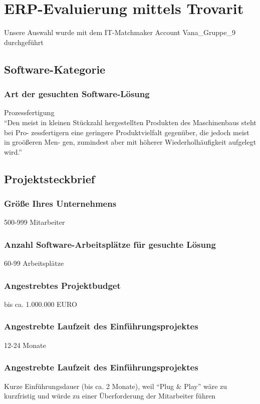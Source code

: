 \section{ERP-Evaluierung mittels Trovarit}
Unsere Auswahl wurde mit dem IT-Matchmaker Account Vana\_Gruppe\_9 durchgeführt


\subsection{Software-Kategorie}
\subsubsection{Art der gesuchten Software-Lösung}
Prozessfertigung\\
\enquote{Den meist in kleinen Stückzahl hergestellten Produkten des Maschinenbaus steht bei Pro- zessfertigern eine geringere Produktvielfalt gegenüber, die jedoch meist in groößeren Men- gen, zumindest aber mit höherer Wiederholhäufigkeit aufgelegt wird.} \cite{trovarit_prozessfertigung}

\subsection{Projektsteckbrief}
\subsubsection{Größe Ihres Unternehmens}
500-999 Mitarbeiter
\subsubsection{Anzahl Software-Arbeitsplätze für gesuchte Lösung}
60-99 Arbeitsplätze
\subsubsection{Angestrebtes Projektbudget}
bis ca. 1.000.000 EURO
\subsubsection{Angestrebte Laufzeit des Einführungsprojektes}
12-24 Monate
\subsubsection{Angestrebte Laufzeit des Einführungsprojektes}
Kurze Einführungsdauer (bis ca. 2 Monate), weil \enquote{Plug \& Play} wäre zu kurzfristig und würde zu einer Überforderung der Mitarbeiter führen
